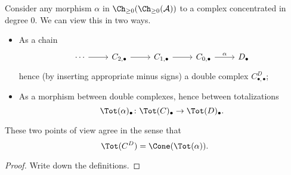 \documentclass[main.tex]{subfiles}
\begin{document}
Consider any morphism $\alpha$ in $\Ch_{\geq 0}(\Ch_{\geq 0}(\mathcal{A}))$ to a complex concentrated in degree 0. We can view this in two ways.
\begin{itemize}
  \item As a chain
    \begin{equation*}
      \begin{tikzcd}
        \cdots
        \arrow[r]
        & C_{2,\bullet}
        \arrow[r]
        & C_{1,\bullet}
        \arrow[r]
        & C_{0,\bullet}
        \arrow[r, "\alpha"]
        & D_{\bullet}
      \end{tikzcd}
    \end{equation*}
    hence (by inserting appropriate minus signs) a double complex $C^{D}_{\bullet,\bullet}$;

  \item As a morphism between double complexes, hence between totalizations
    \begin{equation*}
      \Tot(\alpha)_{\bullet}\colon \Tot(C)_{\bullet} \to \Tot(D)_{\bullet}.
    \end{equation*}
\end{itemize}

\begin{lemma}
  \label{lemma:total_complex_is_cone_of_quasi_isomorphism}
  These two points of view agree in the sense that
  \begin{equation*}
    \Tot(C^{D}) = \Cone(\Tot(\alpha)).
  \end{equation*}
\end{lemma}
\begin{proof}
  Write down the definitions.
\end{proof}
\end{document}
